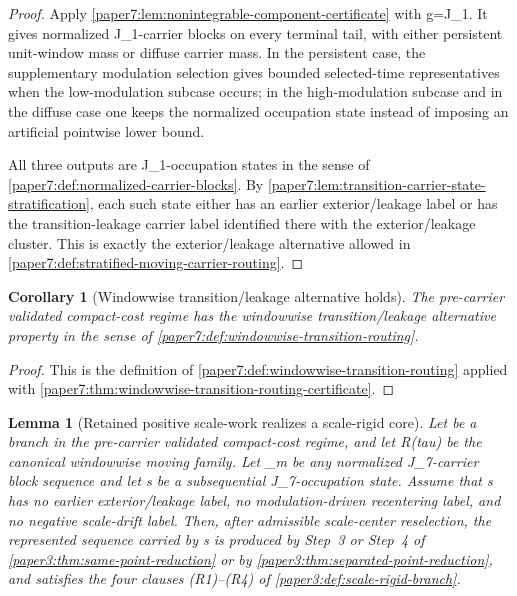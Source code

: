 \documentclass[11pt]{amsart}
\def\({}%
\def\){}%
\def\mathfrak#1{#1}%
\def\tau{tau}%
\theoremstyle{plain}
\newtheorem{lemma}[lemma]{Lemma}
\newtheorem{corollary}[corollary]{Corollary}
\theoremstyle{definition}
\theoremstyle{remark}
\begin{document}
\begin{proof}
Apply \cref{paper7:lem:nonintegrable-component-certificate} with
\(g=J_1\).  It gives normalized \(J_1\)-carrier blocks on every terminal tail,
with either persistent unit-window mass or diffuse carrier mass.  In the
persistent case, the supplementary modulation selection gives bounded
selected-time representatives when the low-modulation subcase occurs; in the
high-modulation subcase and in the diffuse case one keeps the normalized
occupation state instead of imposing an artificial pointwise lower bound.
\par
All three outputs are \(J_1\)-occupation states in the sense of
\cref{paper7:def:normalized-carrier-blocks}.  By
\cref{paper7:lem:transition-carrier-state-stratification}, each such state
either has an earlier exterior/leakage label or has the transition-leakage
carrier label identified there with the exterior/leakage cluster.  This is
exactly the exterior/leakage alternative allowed in
\cref{paper7:def:stratified-moving-carrier-routing}.
\end{proof}

\begin{corollary}[Windowwise transition/leakage alternative holds]
\label{paper7:cor:windowwise-transition-routing-holds}
The pre-carrier validated compact-cost regime has the windowwise
transition/leakage alternative property in the sense of
\cref{paper7:def:windowwise-transition-routing}.
\end{corollary}

\begin{proof}
This is the definition of
\cref{paper7:def:windowwise-transition-routing} applied with
\cref{paper7:thm:windowwise-transition-routing-certificate}.
\end{proof}

\begin{lemma}[Retained positive scale-work realizes a scale-rigid core]
\label{paper7:lem:positive-scale-carrier-core-realization}
Let \(\omega\) be a branch in the pre-carrier validated compact-cost regime,
and let \(R(\tau)\) be the canonical windowwise moving family.  Let
\(\mu_m\) be any normalized \(J_7\)-carrier block sequence and let \(\mathfrak
s\) be a subsequential \(J_7\)-occupation state.  Assume that \(\mathfrak s\) has
no earlier exterior/leakage label, no modulation-driven recentering label, and
no negative scale-drift label.  Then, after admissible scale-center
reselection, the represented sequence carried by \(\mathfrak s\) is produced
by Step~3 or Step~4 of \cref{paper3:thm:same-point-reduction} or by
\cref{paper3:thm:separated-point-reduction}, and satisfies the four clauses
(R1)--(R4) of \cref{paper3:def:scale-rigid-branch}.
\end{lemma}
\end{document}

